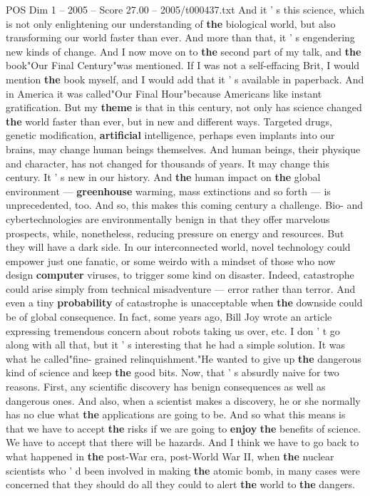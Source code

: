 \begin{textsample}{POS Dim 1 – 2005 – Score 27.00 – 2005/t000437.txt}
And it ' s this science, which is not only enlightening our understanding of \textbf{the} biological world, but also transforming our world faster than ever.
And more than that, it ' s engendering new kinds of change.
And I now move on to \textbf{the} second part of my talk, and \textbf{the} book"Our Final Century"was mentioned.
If I was not a self-effacing Brit, I would mention \textbf{the} book myself, and I would add that it ' s available in paperback.
And in America it was called"Our Final Hour"because Americans like instant gratification.
But my \textbf{theme} is that in this century, not only has science changed \textbf{the} world faster than ever, but in new and different ways.
Targeted drugs, genetic modification, \textbf{artificial} intelligence, perhaps even implants into our brains, may change human beings themselves.
And human beings, their physique and character, has not changed for thousands of years.
It may change this century.
It ' s new in our history.
And \textbf{the} human impact on \textbf{the} global environment — \textbf{greenhouse} warming, mass extinctions and so forth — is unprecedented, too.
And so, this makes this coming century a challenge.
Bio- and cybertechnologies are environmentally benign in that they offer marvelous prospects, while, nonetheless, reducing pressure on energy and resources.
But they will have a dark side.
In our interconnected world, novel technology could empower just one fanatic, or some weirdo with a mindset of those who now design \textbf{computer} viruses, to trigger some kind on disaster.
Indeed, catastrophe could arise simply from technical misadventure — error rather than terror.
And even a tiny \textbf{probability} of catastrophe is unacceptable when \textbf{the} downside could be of global consequence.
In fact, some years ago, Bill Joy wrote an article expressing tremendous concern about robots taking us over, etc.
I don ' t go along with all that, but it ' s interesting that he had a simple solution.
It was what he called"fine- grained relinquishment."He wanted to give up \textbf{the} dangerous kind of science and keep \textbf{the} good bits.
Now, that ' s absurdly naive for two reasons.
First, any scientific discovery has benign consequences as well as dangerous ones.
And also, when a scientist makes a discovery, he or she normally has no clue what \textbf{the} applications are going to be.
And so what this means is that we have to accept \textbf{the} risks if we are going to \textbf{enjoy} \textbf{the} benefits of science.
We have to accept that there will be hazards.
And I think we have to go back to what happened in \textbf{the} post-War era, post-World War II, when \textbf{the} nuclear scientists who ' d been involved in making \textbf{the} atomic bomb, in many cases were concerned that they should do all they could to alert \textbf{the} world to \textbf{the} dangers.

\end{textsample}
